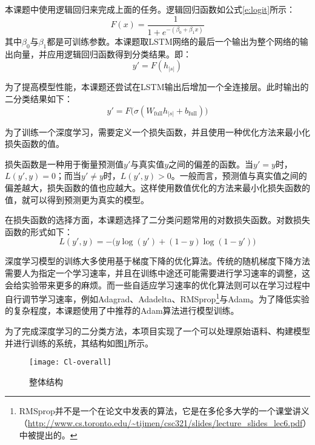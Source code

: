 本课题中使用逻辑回归来完成上面的任务。逻辑回归函数如公式\ref{e:logit}所示：
\begin{equation}
F(x) = \frac{1}{1 + e^{-(\beta_0 + \beta_1 x)}}
\label{e:logit}
\end{equation}
其中$\beta_0$与$\beta_1$都是可训练参数。本课题取LSTM网络的最后一个输出为整个网络的输出向量，并应用逻辑回归函数得到分类结果。即：
\begin{equation}
y' = F(h_{|s|})
\end{equation}

为了提高模型性能，本课题还尝试在LSTM输出后增加一个全连接层。此时输出的二分类结果如下：
\begin{equation}
y' = F\bigl(\sigma(W_\text{full} h_{|s|} + b_\text{full})\bigr)
\end{equation}

为了训练一个深度学习，需要定义一个损失函数，并且使用一种优化方法来最小化损失函数的值。

损失函数是一种用于衡量预测值$y'$与真实值$y$之间的偏差的函数。当$y' = y$时，$L(y', y) = 0$；而当$y' \neq y$时，$L(y', y) > 0$。一般而言，预测值与真实值之间的偏差越大，损失函数的值也应越大。这样使用数值优化的方法来最小化损失函数的值，就可以得到预测更为真实的模型。

在损失函数的选择方面，本课题选择了二分类问题常用的对数损失函数。对数损失函数的形式如下：
\begin{equation}
L(y', y) = -\bigl(y \log(y') + (1 - y) \log(1 - y')\bigr)
\end{equation}

深度学习模型的训练大多使用基于梯度下降的优化算法。传统的随机梯度下降方法需要人为指定一个学习速率，并且在训练中途还可能需要进行学习速率的调整，这会给实验带来更多的麻烦。而一些自适应学习速率的优化算法则可以在学习过程中自行调节学习速率，例如Adagrad、Adadelta、RMSprop\footnote{RMSprop并不是一个在论文中发表的算法，它是在多伦多大学的一个课堂讲义（\url{http://www.cs.toronto.edu/~tijmen/csc321/slides/lecture_slides_lec6.pdf}）中被提出的。}与Adam。为了降低实验的复杂程度，本课题使用了\cite{Ruder2016}中推荐的Adam算法进行模型训练。

为了完成深度学习的二分类方法，本项目实现了一个可以处理原始语料、构建模型并进行训练的系统，其结构如图\ref{f:classfier overall}所示。
\begin{figure}[htbp]
	\centering
	\texttt{[image: Cl-overall]}
	\caption{整体结构}
	\label{f:classfier overall}
	\vspace{-1em}
\end{figure}

